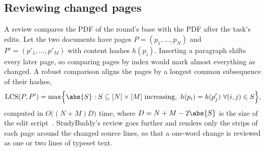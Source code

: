 \subsection{Reviewing changed pages}

A review compares the PDF of the round's base with the PDF after the task's
edits. Let the two documents have pages $P = (p_1, \dots, p_N)$ and
$P' = (p'_1, \dots, p'_M)$ with content hashes $h(p_i)$. Inserting a paragraph
shifts every later page, so comparing pages by index would mark almost
everything as changed. A robust comparison aligns the pages by a longest common
subsequence of their hashes,
\begin{equation}
  \operatorname{LCS}(P, P') = \max\Bigl\{ \abs{S} : S \subseteq [N]\times[M]
  \text{ increasing},\ h(p_i) = h(p'_j)\ \forall (i,j) \in S \Bigr\},
\end{equation}
computed in $O\bigl((N + M) D\bigr)$ time, where $D = N + M - 2\abs{S}$ is the
size of the edit script~\cite{myers1986}. StudyBuddy's review goes further and
renders only the strips of each page around the changed source lines, so that
a one-word change is reviewed as one or two lines of typeset text.
